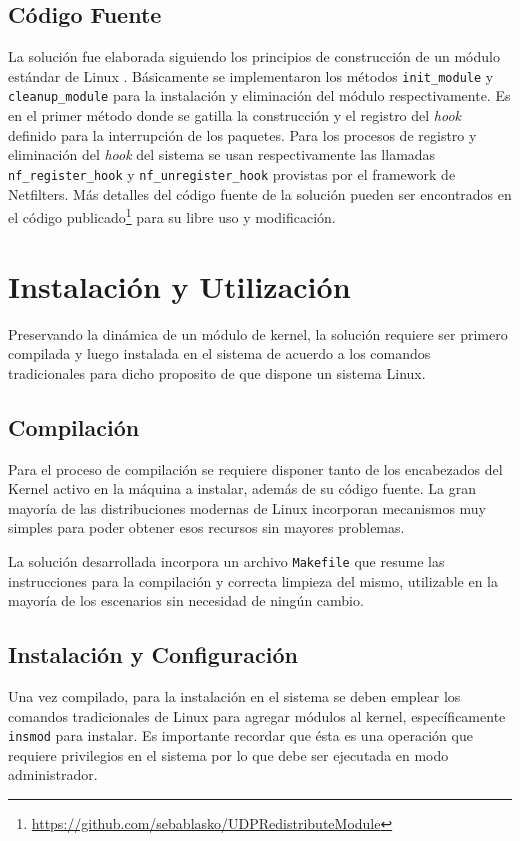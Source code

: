 \subsection{Código Fuente}
La solución fue elaborada siguiendo los principios de construcción de un módulo estándar de Linux \cite{report:netfilterModule}. Básicamente se implementaron los métodos \verb=init_module= y \verb=cleanup_module= para la instalación y eliminación del módulo respectivamente. Es en el primer método donde se gatilla la construcción y el registro del \emph{hook} definido para la interrupción de los paquetes. Para los procesos de registro y eliminación del \emph{hook} del sistema se usan respectivamente las llamadas \verb=nf_register_hook= y \verb=nf_unregister_hook= provistas por el framework de Netfilters. Más detalles del código fuente de la solución pueden ser encontrados en el código publicado\footnote{\url{https://github.com/sebablasko/UDPRedistributeModule}} para su libre uso y modificación.


\section{Instalación y Utilización}
Preservando la dinámica de un módulo de kernel, la solución requiere ser primero compilada y luego instalada en el sistema de acuerdo a los comandos tradicionales para dicho proposito de que dispone un sistema Linux.

\subsection{Compilación}
Para el proceso de compilación se requiere disponer tanto de los encabezados del Kernel activo en la máquina a instalar, además de su código fuente. La gran mayoría de las distribuciones modernas de Linux incorporan mecanismos muy simples para poder obtener esos recursos sin mayores problemas.

La solución desarrollada incorpora un archivo \verb=Makefile= que resume las instrucciones para la compilación y correcta limpieza del mismo, utilizable en la mayoría de los escenarios sin necesidad de ningún cambio.

\subsection{Instalación y Configuración}
Una vez compilado, para la instalación en el sistema se deben emplear los comandos tradicionales de Linux para agregar módulos al kernel, específicamente \verb=insmod= para instalar. Es importante recordar que ésta es una operación que requiere privilegios en el sistema por lo que debe ser ejecutada en modo administrador.

